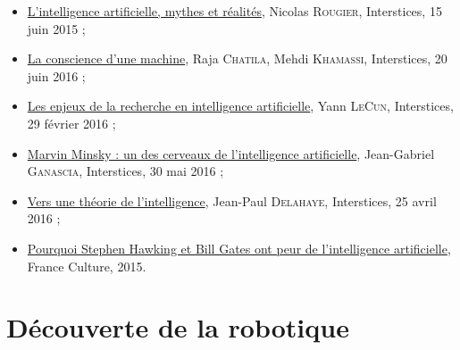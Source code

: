 \begin{gofurther}
\begin{itemize}\jazzitem
\item \href{https://interstices.info/lintelligence-artificielle-mythes-et-realites/}{L’intelligence artificielle, mythes et réalités}, Nicolas \textsc{Rougier}, Interstices, 15 juin 2015 ;
\item \href{https://interstices.info/la-conscience-dune-machine/}{La conscience d’une machine}, Raja \textsc{Chatila}, Mehdi \textsc{Khamassi}, Interstices, 20 juin 2016 ;
\item \href{https://interstices.info/les-enjeux-de-la-recherche-en-intelligence-artificielle/}{Les enjeux de la recherche en intelligence artificielle}, Yann \textsc{LeCun}, Interstices, 29 février 2016 ;
\item \href{https://interstices.info/marvin-minsky-un-des-cerveaux-de-lintelligence-artificielle/}{Marvin Minsky : un des cerveaux de l’intelligence artificielle}, Jean-Gabriel \textsc{Ganascia}, Interstices, 30 mai 2016 ;
\item \href{https://interstices.info/vers-une-theorie-de-lintelligence/}{Vers une théorie de l’intelligence}, Jean-Paul \textsc{Delahaye}, Interstices, 25 avril 2016 ;
\item \href{https://www.franceculture.fr/sciences/pourquoi-stephen-hawking-et-bill-gates-ont-peur-de-lintelligence-artificielle}{Pourquoi Stephen Hawking et Bill Gates ont peur de l'intelligence artificielle}, France Culture, 2015.
\end{itemize}
\end{gofurther}




\section[Découverte de la robotique]{Découverte de la robotique}
\label{sec:III.2}

